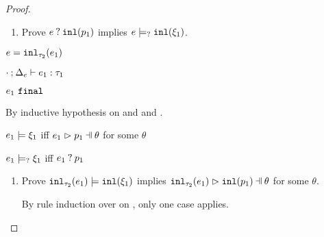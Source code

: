 \begin{proof}
\begin{byCases}
\begin{byCases}
\begin{enumerate}
\begin{pfsteps*}
            \end{pfsteps*}
        \item Prove $e \mathbin{?} \mathtt{inl}(p_1)$ implies $e \models_{?} \mathtt{inl}(\xi_1)$.
        \end{enumerate}
    \item[\text{(\ref{rule:TInl})}]
        \begin{pfsteps*}
        \item $e=\mathtt{inl}_{\tau_2}({e_1})$ 
        \item $\cdot \mathbin{;} \Delta_e \vdash e_1 : \tau_1$  
        \item $e_1 ~\mathtt{final}$  
        \end{pfsteps*}
        By inductive hypothesis on  and  and .
        \begin{pfsteps*}
        \item $e_1 \models \xi_1$ iff $\hpatmatch{e_1}{p_1}{\theta}$ for some $\theta$ 
        \item $e_1 \models_{?} \xi_1$ iff $e_1 \mathbin{?} p_1$ 
        \end{pfsteps*}
        \begin{enumerate}
        \item Prove $\mathtt{inl}_{\tau_2}({e_1}) \models \mathtt{inl}(\xi_1)$ implies $\hpatmatch{\hinl{\tau_2}{e_1}}{\hinlp{p_1}}{\theta}$ for some $\theta$.
            By rule induction over  on , only one case applies.
            \begin{byCases}
            \item[\text{(\ref{rule:CSInl})}]

\end{byCases}
\end{enumerate}
\end{byCases}
\end{byCases}
\end{proof}
